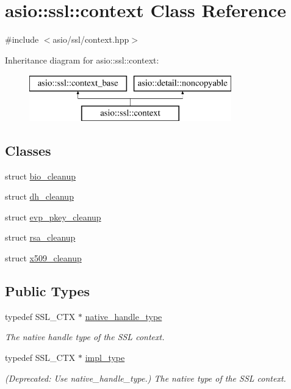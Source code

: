 \hypertarget{classasio_1_1ssl_1_1context}{}\section{asio\+:\+:ssl\+:\+:context Class Reference}
\label{classasio_1_1ssl_1_1context}


{\ttfamily \#include $<$asio/ssl/context.\+hpp$>$}

Inheritance diagram for asio\+:\+:ssl\+:\+:context\+:\begin{figure}[H]
\begin{center}
\leavevmode
\includegraphics[height=2.000000cm]{classasio_1_1ssl_1_1context}
\end{center}
\end{figure}
\subsection*{Classes}
\begin{DoxyCompactItemize}
\item 
struct \hyperlink{structasio_1_1ssl_1_1context_1_1bio__cleanup}{bio\+\_\+cleanup}
\item 
struct \hyperlink{structasio_1_1ssl_1_1context_1_1dh__cleanup}{dh\+\_\+cleanup}
\item 
struct \hyperlink{structasio_1_1ssl_1_1context_1_1evp__pkey__cleanup}{evp\+\_\+pkey\+\_\+cleanup}
\item 
struct \hyperlink{structasio_1_1ssl_1_1context_1_1rsa__cleanup}{rsa\+\_\+cleanup}
\item 
struct \hyperlink{structasio_1_1ssl_1_1context_1_1x509__cleanup}{x509\+\_\+cleanup}
\end{DoxyCompactItemize}
\subsection*{Public Types}
\begin{DoxyCompactItemize}
\item 
typedef S\+S\+L\+\_\+\+C\+T\+X $\ast$ \hyperlink{classasio_1_1ssl_1_1context_a9f209f7e8420cbc694612e47eff53cc1}{native\+\_\+handle\+\_\+type}
\begin{DoxyCompactList}\small\item\em The native handle type of the S\+S\+L context. \end{DoxyCompactList}\item 
typedef S\+S\+L\+\_\+\+C\+T\+X $\ast$ \hyperlink{classasio_1_1ssl_1_1context_a5d497f2bb2fc277da12dc07c6ceea6fd}{impl\+\_\+type}
\begin{DoxyCompactList}\small\item\em (Deprecated\+: Use native\+\_\+handle\+\_\+type.) The native type of the S\+S\+L context. \end{DoxyCompactList}\end{DoxyCompactItemize}

